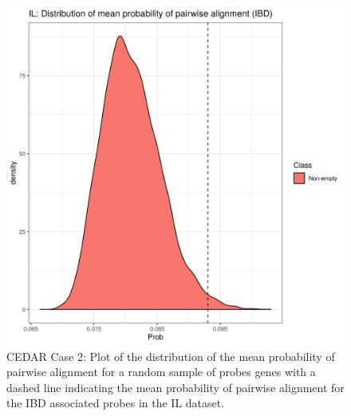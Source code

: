 \documentclass[14pt]{extarticle} %
\begin{document}
	
	\begin{figure}[h]
		\centering
		\includegraphics[scale=0.75]{Images/Biology_data/Set_1000/All_datasets/Mean_alignment_probability/IL_KEGG_INFLAMMATORY_BOWEL_DISEASE.png}
		\caption{CEDAR Case 2: Plot of the distribution of the mean probability of pairwise alignment for a random sample of probes genes with a dashed line indicating the mean probability of pairwise alignment for the IBD associated probes in the IL dataset.}
		\label{fig:results:cedar_2:mdi_il_ibd_alignment_prob_distn}
	\end{figure}
	
\end{document}
